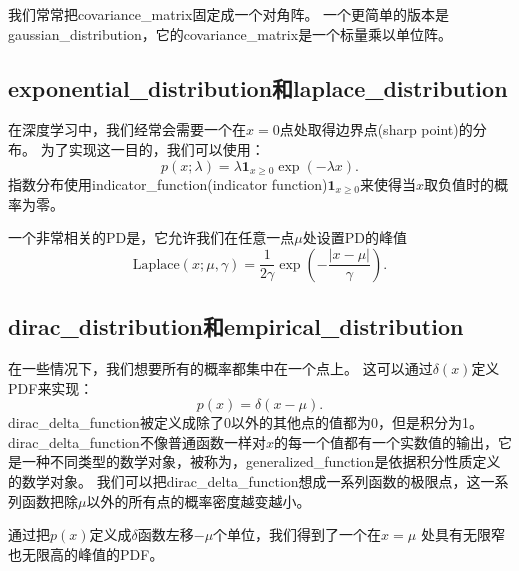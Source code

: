 
我们常常把\gls{covariance_matrix}固定成一个对角阵。
一个更简单的版本是\gls{gaussian_distribution}，它的\gls{covariance_matrix}是一个标量乘以单位阵。

\subsection{\gls{exponential_distribution}和\gls{laplace_distribution}}
\label{sec:exponential_and_laplace_distributions}

在深度学习中，我们经常会需要一个在$x=0$点处取得边界点(sharp point)的分布。
为了实现这一目的，我们可以使用：
\begin{equation}
p(x; \lambda) = \lambda \bm{1}_{x\ge 0} \exp(-\lambda x).
\end{equation}
指数分布使用\gls{indicator_function}(indicator function)$\bm{1}_{x\ge 0}$来使得当$x$取负值时的概率为零。

一个非常相关的\gls{PD}是，它允许我们在任意一点$\mu$处设置\gls{PD}的峰值
\begin{equation}
\text{Laplace}(x; \mu, \gamma) = \frac{1}{2\gamma} \exp \left( -\frac{|x-\mu|}{\gamma}  \right).
\end{equation}

\subsection{\gls{dirac_distribution}和\gls{empirical_distribution}}
\label{sec:the_dirac_distribution_and_empirical_distribution}

在一些情况下，我们想要所有的概率都集中在一个点上。
这可以通过$\delta(x)$定义\gls{PDF}来实现：
\begin{equation}
p(x) = \delta(x-\mu).
\end{equation}
\gls{dirac_delta_function}被定义成除了0以外的其他点的值都为0，但是积分为1。
\gls{dirac_delta_function}不像普通函数一样对$x$的每一个值都有一个实数值的输出，它是一种不同类型的数学对象，被称为，\gls{generalized_function}是依据积分性质定义的数学对象。
我们可以把\gls{dirac_delta_function}想成一系列函数的极限点，这一系列函数把除$\mu$以外的所有点的概率密度越变越小。


通过把$p(x)$定义成$\delta$函数左移$-\mu$个单位，我们得到了一个在$x=\mu$ 处具有无限窄也无限高的峰值的\gls{PDF}。

